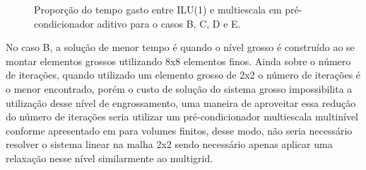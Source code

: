 \begin{figure}[h]
\center
{}
\qquad
{}
\qquad
{}
\caption{Proporção do tempo gasto entre ILU(1) e multiescala em pré-condicionador aditivo para o casos B, C, D e E.  }
\label{fig:proporcaoPrecondicionador}
\end{figure}


No caso B, a solução de menor tempo é quando o nível grosso é construído ao se montar elementos grossos utilizando 8x8 elementos finos. Ainda sobre o número de iterações, quando utilizado um elemento grosso de 2x2 o número de iterações é o menor encontrado, porém o custo de solução do sistema grosso impossibilita a utilização desse nível de engrossamento, uma maneira de aproveitar essa redução do número de iterações seria utilizar um pré-condicionador multiescala multinível conforme apresentado em \cite{multilevel} para volumes finitos, desse modo, não seria necessário resolver o sistema linear na malha 2x2 sendo necessário apenas aplicar uma relaxação nesse nível similarmente ao multigrid.

